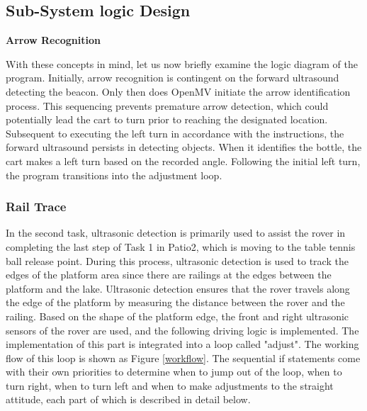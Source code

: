 \documentclass[12pt, a4paper, oneside]{report}
\begin{document}
\subsection{Sub-System logic Design}
\textbf{Arrow Recognition}


With these concepts in mind, let us now briefly examine the logic diagram of the program. Initially, arrow recognition is contingent on the forward ultrasound detecting the beacon. Only then does OpenMV initiate the arrow identification process. This sequencing prevents premature arrow detection, which could potentially lead the cart to turn prior to reaching the designated location. Subsequent to executing the left turn in accordance with the instructions, the forward ultrasound persists in detecting objects. When it identifies the bottle, the cart makes a left turn based on the recorded angle. Following the initial left turn, the program transitions into the adjustment loop.

\subsubsection{Rail Trace}
In the second task, ultrasonic detection is primarily used to assist the rover in completing the last step of Task 1 in Patio2, which is moving to the table tennis ball release point. During this process, ultrasonic detection is used to track the edges of the platform area since there are railings at the edges between the platform and the lake. Ultrasonic detection ensures that the rover travels along the edge of the platform by measuring the distance between the rover and the railing. Based on the shape of the platform edge, the front and right ultrasonic sensors of the rover are used, and the following driving logic is implemented. The implementation of this part is integrated into a loop called "adjust". The working flow of this loop is shown as Figure \ref{workflow}. The sequential if statements come with their own priorities to determine when to jump out of the loop, when to turn right, when to turn left and when to make adjustments to the straight attitude, each part of which is described in detail below.
\end{document}
